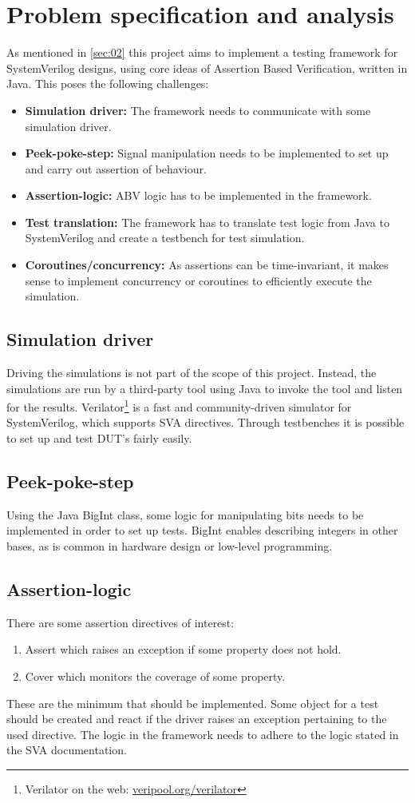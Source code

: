 \section{Problem specification and analysis}\label{sec:03}
As mentioned in \cref{sec:02} this project aims to implement a testing framework for SystemVerilog designs, using core ideas of Assertion Based Verification, written in Java. This poses the following challenges:
\begin{itemize}
    \item \textbf{Simulation driver:} The framework needs to communicate with some simulation driver.
    \item \textbf{Peek-poke-step:} Signal manipulation needs to be implemented to set up and carry out assertion of behaviour.
    \item \textbf{Assertion-logic: } ABV logic has to be implemented in the framework.
    \item \textbf{Test translation:} The framework has to translate test logic from Java to SystemVerilog and create a testbench for test simulation.
    \item \textbf{Coroutines/concurrency:} As assertions can be time-invariant, it makes sense to implement concurrency or coroutines to efficiently execute the simulation.
\end{itemize}
\subsection{Simulation driver}
Driving the simulations is not part of the scope of this project. Instead, the simulations are run by a third-party tool using Java to invoke the tool and listen for the results. Verilator\footnote{Verilator on the web: \href{https://www.veripool.org/verilator/}{veripool.org/verilator}} is a fast and community-driven simulator for SystemVerilog, which supports SVA directives. Through testbenches it is possible to set up and test DUT's fairly easily.
\subsection{Peek-poke-step}
Using the Java BigInt class, some logic for manipulating bits needs to be implemented in order to set up tests. BigInt enables describing integers in other bases, as is common in hardware design or low-level programming.
\subsection{Assertion-logic}
There are some assertion directives of interest:
\begin{enumerate}
    \item Assert which raises an exception if some property does not hold.
    \item Cover which monitors the coverage of some property.
\end{enumerate}
These are the minimum that should be implemented. Some object for a test should be created and react if the driver raises an exception pertaining to the used directive.
The logic in the framework needs to adhere to the logic stated in the SVA documentation.
